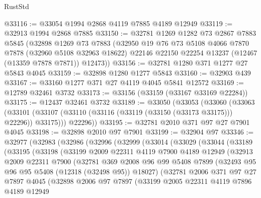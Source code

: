 \begin{lexlean}{RustStd}
\begin{coremodule}
@33116 := @33054 @1994 @2868 @4119 @7885 @4189 @12949
@33119 := @32913 @1994 @2868 @7885
@33150 := @32781
    @1269
    @1282
    @73
    @2867
    @7883
    @5845
    (@32898
      @1269
      @73
      @7883
      (@32950
        @19
        @76
        @73
        @5108
        @4066
        @7870
        @7878
        (@32960 @5108 @32963 @18622)
        @22146
        @22150
        @22254
        @13237
        (@12467 (@13359 @7878 @7871))
        @12473))
@33156 := @32781 @1280 @371 @1277 @27 @5843 @4045
@33159 := @32898 @1280 @1277 @5843
@33160 := @32903 @439
@33167 := @33160 @1277 @371 @27 @4119 @4045 @5841 @12572
@33169 := @12789 @32461 @3732
@33173 := @33156 (@33159 (@33167 @33169 @22284))
@33175 := @12437 @32461 @3732
@33189 := @33050
    (@33053
      (@33060
        (@33063 (@33101 (@33107 (@33110 (@33116 (@33119 (@33150 (@33173 @33175))) @22296)) @33175)))
        @22296))
@33195 := @32781 @2010 @371 @97 @27 @7901 @4045
@33198 := @32898 @2010 @97 @7901
@33199 := @32904 @97
@33346 := @32977
    (@32983
      (@32986
        (@32996
          (@32999
            (@33014
              (@33029
                (@33044
                  (@33189
                    (@33195
                      (@33198
                        (@33199
                          @2009
                          @22311
                          @4119
                          @7900
                          @4189
                          @12949
                          (@32913
                            @2009
                            @22311
                            @7900
                            (@32781
                              @369
                              @2008
                              @96
                              @99
                              @5408
                              @7899
                              (@32493 @95 @96 @95 @5408 (@12318 (@32498 @95)) @18027)
                              (@32781
                                @2006
                                @371
                                @97
                                @27
                                @7897
                                @4045
                                (@32898
                                  @2006
                                  @97
                                  @7897
                                  (@33199
                                    @2005
                                    @22311
                                    @4119
                                    @7896
                                    @4189
                                    @12949

\end{coremodule}
\end{lexlean}
